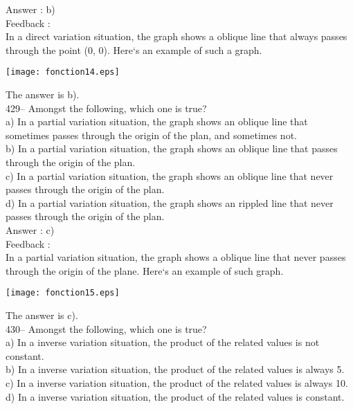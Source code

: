 \documentclass[letterpaper, 12pt]{article}
\begin{document}
Answer :  b)\\

Feedback : \\
In a direct variation situation, the graph shows a
oblique line that always passes through the point (0, 0).  Here`s an example of such a graph.\\
    \begin{center}
    \texttt{[image: fonction14.eps]}
    \end{center}

The answer is b).\\


429-- Amongst the following, which one is true?\\
a) In a partial variation situation, the graph shows an
oblique line that sometimes passes through the origin of the plan, and sometimes not.\\
b) In a partial variation situation, the graph shows an
oblique line that passes through the origin of the plan.\\
c) In a partial variation situation, the graph shows an
oblique line that never passes through the origin of the plan.\\
d) In a partial variation situation, the graph shows an
rippled line that never passes through the origin of the plan.\\

Answer :  c)\\

Feedback : \\
In a partial variation situation, the graph shows a
oblique line that never passes through the origin of the plane. Here`s an example of such graph.\\
    \begin{center}
    \texttt{[image: fonction15.eps]}
    \end{center}
The answer is c).\\


430-- Amongst the following, which one is true?\\
a) In a inverse variation situation, the product of the related values
is not constant.\\
b) In a inverse variation situation, the product of the related values
is always 5.\\
c) In a inverse variation situation, the product of the related values
is always 10.\\
d) In a inverse variation situation, the product of the related values
is constant.\\
\end{document}
